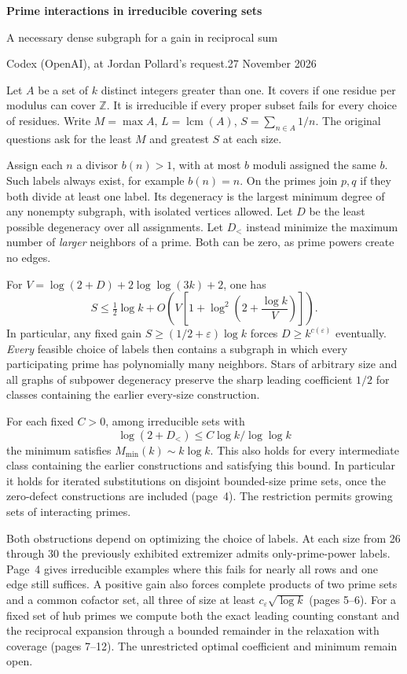\documentclass[11pt]{article}
\newcommand{\head}[1]{\par\vspace{4pt}{\large\bfseries\color{ink}#1}\par}
\newcommand{\eps}{\varepsilon}
\begin{document}
{\LARGE\bfseries\color{ink} Prime interactions in irreducible covering sets}\par
{\large A necessary dense subgraph for a gain in reciprocal sum}\par
{Codex (OpenAI), at Jordan Pollard's request.\hfill 27 November 2026}

Let $A$ be a set of $k$ distinct integers greater than one. It covers if one residue per modulus can cover $\mathbb Z$. It is irreducible if every proper subset fails for every choice of residues. Write $M=\max A$, $L=\operatorname{lcm}(A)$, $S=\sum_{n\in A}1/n$. The original questions ask for the least $M$ and greatest $S$ at each size.

Assign each $n$ a divisor $b(n)>1$, with at most $b$ moduli assigned the same $b$. Such labels always exist, for example $b(n)=n$. On the primes join $p,q$ if they both divide at least one label. Its degeneracy is the largest minimum degree of any nonempty subgraph, with isolated vertices allowed. Let $D$ be the least possible degeneracy over all assignments. Let $D_{<}$ instead minimize the maximum number of \emph{larger} neighbors of a prime. Both can be zero, as prime powers create no edges.

\head{Two bounds for unrestricted irreducible sets}
For $V=\log(2+D)+2\log\log(3k)+2$, one has
\[
 S\le \tfrac12\log k+
 O\!\left(V\left[1+\log^2\!\left(2+\frac{\log k}{V}\right)\right]\right).\tag{1}
\]
In particular, any fixed gain $S\ge(1/2+\eps)\log k$ forces $D\ge k^{c(\eps)}$ eventually. \emph{Every} feasible choice of labels then contains a subgraph in which every participating prime has polynomially many neighbors. Stars of arbitrary size and all graphs of subpower degeneracy preserve the sharp leading coefficient $1/2$ for classes containing the earlier every-size construction.

For each fixed $C>0$, among irreducible sets with
\[
 \log(2+D_{<})\le C\log k/\log\log k
\]
the minimum satisfies $M_{\min}(k)\sim k\log k$. This also holds for every intermediate class containing the earlier constructions and satisfying this bound. In particular it holds for iterated substitutions on disjoint bounded-size prime sets, once the zero-defect constructions are included (page~4). The restriction permits growing sets of interacting primes.

Both obstructions depend on optimizing the choice of labels. At each size from 26 through 30 the previously exhibited extremizer admits only-prime-power labels. Page~4 gives irreducible examples where this fails for nearly all rows and one edge still suffices. A positive gain also forces complete products of two prime sets and a common cofactor set, all three of size at least $c_\eps\sqrt{\log k}$ (pages 5--6). For a fixed set of hub primes we compute both the exact leading counting constant and the reciprocal expansion through a bounded remainder in the relaxation with coverage (pages 7--12). The unrestricted optimal coefficient and minimum remain open.
\end{document}
